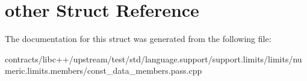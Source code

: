 \hypertarget{structother}{}\section{other Struct Reference}
\label{structother}


The documentation for this struct was generated from the following file\+:\begin{DoxyCompactItemize}
\item 
contracts/libc++/upstream/test/std/language.\+support/support.\+limits/limits/numeric.\+limits.\+members/const\+\_\+data\+\_\+members.\+pass.\+cpp\end{DoxyCompactItemize}
